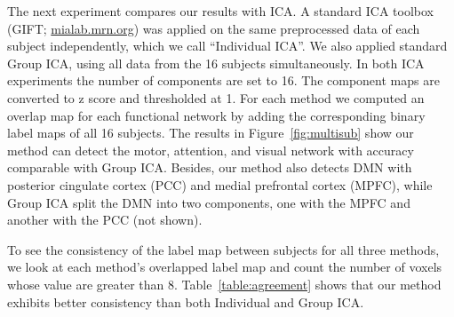 \documentclass[runningheads, a4paper]{llncs}
\begin{document}
The next experiment compares our results with ICA. A standard ICA toolbox (GIFT;
\url{mialab.mrn.org}) was applied on the same preprocessed data of each subject
independently, which we call ``Individual ICA''. We also applied standard Group
ICA, using all data from the 16 subjects simultaneously. In both ICA experiments
the number of components are set to 16. The component maps are converted to z
score and thresholded at 1. For each method we computed an overlap map for each
functional network by adding the corresponding binary label maps of all 16 subjects.
The results in Figure~\ref{fig:multisub} show our method can detect the motor,
attention, and visual network with accuracy comparable with Group ICA. Besides,
our method also detects DMN with posterior cingulate cortex (PCC) and medial
prefrontal cortex (MPFC), while Group ICA split the DMN into two components, one
with the MPFC and another with the PCC (not shown).

To see the consistency of the label map between subjects for all three methods,
we look at each method's overlapped label map and count the number of voxels
whose value are greater than 8. Table~\ref{table:agreement} shows that our
method exhibits better consistency than both Individual and Group ICA.
\end{document}
